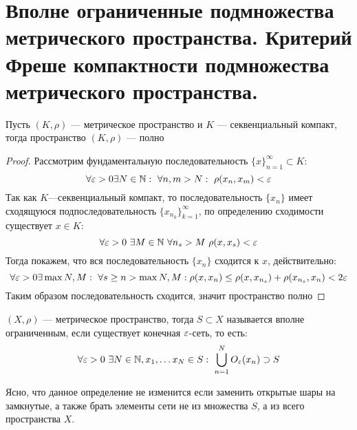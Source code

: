 \newpage
\section{Вполне ограниченные подмножества метрического пространства. Критерий Фреше компактности подмножества метрического пространства.}
{\footnotesize \color{violet}
\begin{claim}
	Пусть $(K, \rho)$ --- метрическое пространство и $K$ --- секвенциальный компакт, тогда пространство $(K, \rho)$ --- полно
\end{claim}
\begin{proof}
	Рассмотрим фундаментальную последовательность $\{x\}_{n = 1}^\infty \subset K$:
	$$
	\forall \eps> 0 \exists N \in \N: \ \forall n,m > N: \ \rho(x_n,x_m) < \eps
	$$
	Так как $K$---секвенциальный компакт, то последовательность $\{x_n\}$ имеет сходящуюся подпоследовательность $\{x_{n_k}\}_{k=1}^\infty$, по определению сходимости существует $x \in K$:
	$$
	\forall \eps > 0 \ \exists M \in \N \ \forall n_s > M \ \rho(x, x_s) < \eps
	$$
	Тогда покажем, что вся последовательность $\{x_n\}$ сходится к $x$, действительно:
	$$
	\forall \varepsilon > 0 \exists \max{N,M}: \ \forall s \geq n > \max{N,M}: \rho(x, x_n) \leq \rho(x, x_{n_s}) + \rho(x_{n_s}, x_n) < 2\varepsilon
	$$
	Таким образом последовательность сходится, значит пространство полно
\end{proof}
}
\begin{definition}
	$(X, \rho)$ --- метрическое пространство, тогда $S \subset X$ называется вполне ограниченным, если существует конечная $\varepsilon$-сеть, то есть:
	$$
	\forall \varepsilon > 0 \ \exists N \in \mathbb{N}, x_1, \dots x_N \in S: \ \bigcup_{n=1}^N O_\varepsilon(x_n) \supset S
	$$
\end{definition}
\begin{remark}
	Ясно, что данное определение не изменится если заменить открытые шары на замкнутые, а также брать элементы сети не из множества $S$, а из всего пространства $X$. 
\end{remark}

